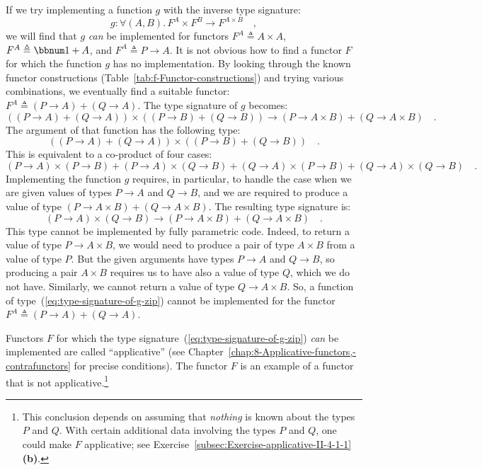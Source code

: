 If we try implementing a function $g$ with the inverse type signature:
\begin{equation}
g:\forall(A,B).\,F^{A}\times F^{B}\rightarrow F^{A\times B}\quad,\label{eq:type-signature-of-g-zip}
\end{equation}
we will find that $g$ \emph{can} be implemented for functors $F^{A}\triangleq A\times A$,
$F^{A}\triangleq\bbnum 1+A$, and $F^{A}\triangleq P\rightarrow A$.
It is not obvious how to find a functor $F$ for which the function
$g$ has no implementation. By looking through the known functor constructions
(Table~\ref{tab:f-Functor-constructions}) and trying various combinations,
we eventually find a suitable functor: $F^{A}\triangleq(P\rightarrow A)+(Q\rightarrow A)$.
The type signature of $g$ becomes:
\[
\left((P\rightarrow A)+(Q\rightarrow A)\right)\times\left((P\rightarrow B)+(Q\rightarrow B)\right)\rightarrow(P\rightarrow A\times B)+(Q\rightarrow A\times B)\quad.
\]
The argument of that function has the following type:
\[
\left((P\rightarrow A)+(Q\rightarrow A)\right)\times\left((P\rightarrow B)+(Q\rightarrow B)\right)\quad.
\]
This is equivalent to a co-product of four cases:
\[
(P\rightarrow A)\times(P\rightarrow B)+(P\rightarrow A)\times(Q\rightarrow B)+(Q\rightarrow A)\times(P\rightarrow B)+(Q\rightarrow A)\times(Q\rightarrow B)\quad.
\]
Implementing the function $g$ requires, in particular, to handle
the case when we are given values of types $P\rightarrow A$ and $Q\rightarrow B$,
and we are required to produce a value of type $(P\rightarrow A\times B)+(Q\rightarrow A\times B)$.
The resulting type signature is:
\[
(P\rightarrow A)\times(Q\rightarrow B)\rightarrow(P\rightarrow A\times B)+(Q\rightarrow A\times B)\quad.
\]
This type cannot be implemented by fully parametric code. Indeed,
to return a value of type $P\rightarrow A\times B$, we would need
to produce a pair of type $A\times B$ from a value of type $P$.
But the given arguments have types $P\rightarrow A$ and $Q\rightarrow B$,
so producing a pair $A\times B$ requires us to have also a value
of type $Q$, which we do not have. Similarly, we cannot return a
value of type $Q\rightarrow A\times B$. So, a function of type~(\ref{eq:type-signature-of-g-zip})
cannot be implemented for the functor $F^{A}\triangleq(P\rightarrow A)+(Q\rightarrow A)$.

Functors $F$ for which the type signature~(\ref{eq:type-signature-of-g-zip})
\emph{can} be implemented are called \textsf{``}applicative\textsf{''}
(see Chapter~\ref{chap:8-Applicative-functors,-contrafunctors} for
precise conditions). The functor $F$ is an example of a functor that
is not applicative.\footnote{This conclusion depends on assuming that \emph{nothing} is known about
the types $P$ and $Q$. With certain additional data involving the
types $P$ and $Q$, one could make $F$ applicative; see Exercise~\ref{subsec:Exercise-applicative-II-4-1-1}\textbf{(b)}. }

